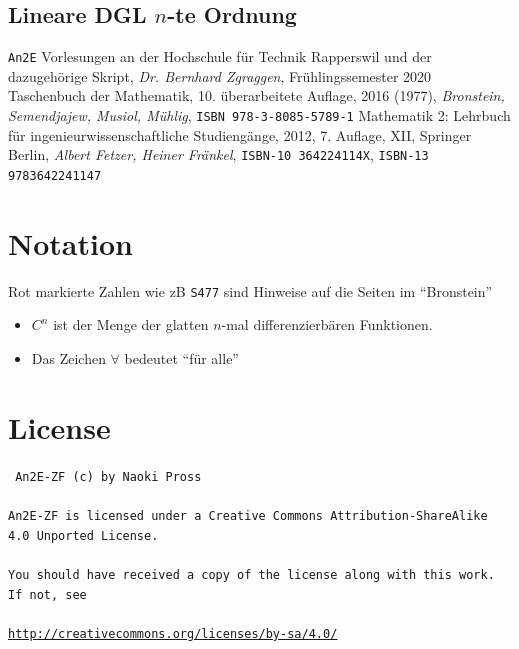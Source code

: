 \documentclass[margin=small, twocolumn]{hsrzf}
\numberwithin{equation}{subsection}
\newcommand{\brpage}[1]{\textcolor{red!70!black}{\small\texttt{S#1}}}
\begin{document}
\subsection{Lineare DGL \(n\)-te Ordnung}


\begin{thebibliography}{3}
    \texttt{An2E} Vorlesungen an der Hochschule f\"ur Technik Rapperswil und der dazugeh\"orige Skript,
    \textit{Dr. Bernhard Zgraggen}, Fr\"uhlingssemester 2020
    Taschenbuch der Mathematik,
    10. \"uberarbeitete Auflage, 2016 (1977),
    \textit{Bronstein, Semendjajew, Musiol, M\"uhlig}, 
    \texttt{ISBN 978-3-8085-5789-1}
    Mathematik 2: Lehrbuch für ingenieurwissenschaftliche Studieng\"ange,
    2012, 7. Auflage, XII, Springer Berlin,
    \textit{Albert Fetzer, Heiner Fränkel},
    \texttt{ISBN-10 364224114X},
    \texttt{ISBN-13 9783642241147}
    
\end{thebibliography}

\section*{Notation}
Rot markierte Zahlen wie zB \brpage{477} sind Hinweise auf die Seiten im ``Bronstein'' \cite{bronstein}

\begin{itemize}
    \item \(C^n\) ist der Menge der glatten \(n\)-mal differenzierb\"aren Funktionen.
    \item Das Zeichen \(\forall\) bedeutet ``f\"ur alle''
\end{itemize}

\section*{License}
{ \tt
An2E-ZF (c) by Naoki Pross
\\\\
An2E-ZF is licensed under a Creative Commons Attribution-ShareAlike 4.0 Unported License.
\\\\
You should have received a copy of the license along with this work. If not, see 
\\\\
{\small\url{http://creativecommons.org/licenses/by-sa/4.0/}}
}


\onecolumn
\end{document}
